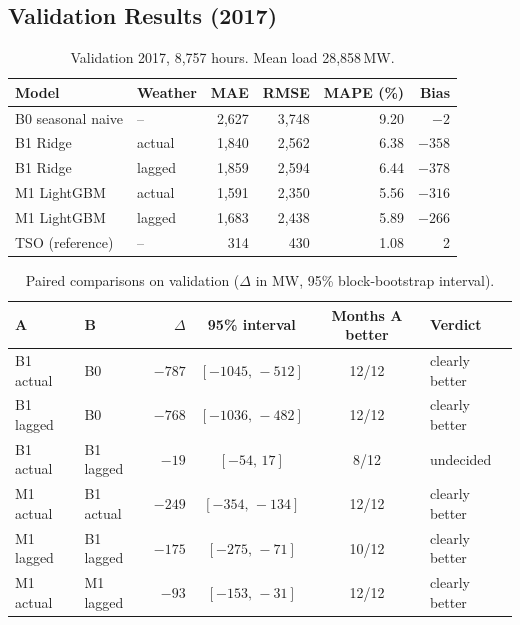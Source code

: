 \subsection{Validation Results (2017)}
\label{sec:eval-val}

\begin{table}[H]
  \centering
  \small
  \caption{Validation 2017, 8{,}757 hours. Mean load 28{,}858\,MW.}
  \label{tab:val}
  \begin{tabular}{@{}l l r r r r@{}}
    \toprule
    Model & Weather & MAE & RMSE & MAPE (\%) & Bias \\
    \midrule
    B0 seasonal naive & -- & 2{,}627 & 3{,}748 & 9.20 & $-2$ \\
    B1 Ridge & actual & 1{,}840 & 2{,}562 & 6.38 & $-358$ \\
    B1 Ridge & lagged & 1{,}859 & 2{,}594 & 6.44 & $-378$ \\
    M1 LightGBM & actual & 1{,}591 & 2{,}350 & 5.56 & $-316$ \\
    M1 LightGBM & lagged & 1{,}683 & 2{,}438 & 5.89 & $-266$ \\
    \midrule
    TSO (reference) & -- & 314 & 430 & 1.08 & 2 \\
    \bottomrule
  \end{tabular}
\end{table}

\begin{table}[H]
  \centering
  \small
  \caption{Paired comparisons on validation ($\Delta$ in MW, 95\% block-bootstrap interval).}
  \label{tab:val-pairs}
  \begin{tabular}{@{}l l r c c l@{}}
    \toprule
    A & B & $\Delta$ & 95\% interval & Months A better & Verdict \\
    \midrule
    B1 actual & B0 & $-787$ & $[-1045,\,-512]$ & 12/12 & clearly better \\
    B1 lagged & B0 & $-768$ & $[-1036,\,-482]$ & 12/12 & clearly better \\
    B1 actual & B1 lagged & $-19$ & $[-54,\,17]$ & 8/12 & undecided \\
    M1 actual & B1 actual & $-249$ & $[-354,\,-134]$ & 12/12 & clearly better \\
    M1 lagged & B1 lagged & $-175$ & $[-275,\,-71]$ & 10/12 & clearly better \\
    M1 actual & M1 lagged & $-93$ & $[-153,\,-31]$ & 12/12 & clearly better \\
    \bottomrule
  \end{tabular}
\end{table}

